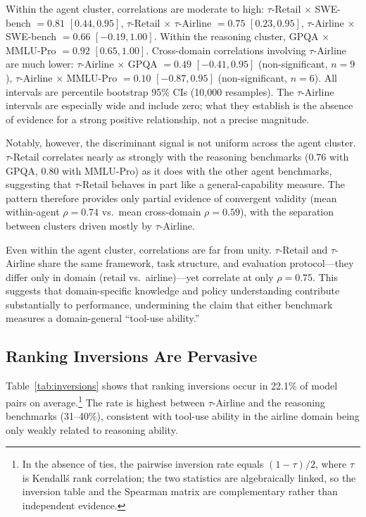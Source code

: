 \documentclass[11pt]{article}
\begin{document}
Within the agent cluster, correlations are moderate to high: $\tau$-Retail $\times$ SWE-bench $= 0.81$ $[0.44, 0.95]$, $\tau$-Retail $\times$ $\tau$-Airline $= 0.75$ $[0.23, 0.95]$, $\tau$-Airline $\times$ SWE-bench $= 0.66$ $[-0.19, 1.00]$. Within the reasoning cluster, GPQA $\times$ MMLU-Pro $= 0.92$ $[0.65, 1.00]$. Cross-domain correlations involving $\tau$-Airline are much lower: $\tau$-Airline $\times$ GPQA $= 0.49$ $[-0.41, 0.95]$ (non-significant, $n = 9$), $\tau$-Airline $\times$ MMLU-Pro $= 0.10$ $[-0.87, 0.95]$ (non-significant, $n = 6$). All intervals are percentile bootstrap 95\% CIs (10{,}000 resamples). The $\tau$-Airline intervals are especially wide and include zero; what they establish is the absence of evidence for a strong positive relationship, not a precise magnitude.

Notably, however, the discriminant signal is not uniform across the agent cluster. $\tau$-Retail correlates nearly as strongly with the reasoning benchmarks ($0.76$ with GPQA, $0.80$ with MMLU-Pro) as it does with the other agent benchmarks, suggesting that $\tau$-Retail behaves in part like a general-capability measure. The pattern therefore provides only partial evidence of convergent validity (mean within-agent $\rho = 0.74$ vs.\ mean cross-domain $\rho = 0.59$), with the separation between clusters driven mostly by $\tau$-Airline.

Even within the agent cluster, correlations are far from unity. $\tau$-Retail and $\tau$-Airline share the same framework, task structure, and evaluation protocol---they differ only in domain (retail vs.\ airline)---yet correlate at only $\rho = 0.75$. This suggests that domain-specific knowledge and policy understanding contribute substantially to performance, undermining the claim that either benchmark measures a domain-general ``tool-use ability.''

\subsection{Ranking Inversions Are Pervasive}
Table~\ref{tab:inversions} shows that ranking inversions occur in 22.1\% of model pairs on average.\footnote{In the absence of ties, the pairwise inversion rate equals $(1-\tau)/2$, where $\tau$ is Kendall\'s rank correlation; the two statistics are algebraically linked, so the inversion table and the Spearman matrix are complementary rather than independent evidence.} The rate is highest between $\tau$-Airline and the reasoning benchmarks (31--40\%), consistent with tool-use ability in the airline domain being only weakly related to reasoning ability.
\end{document}
